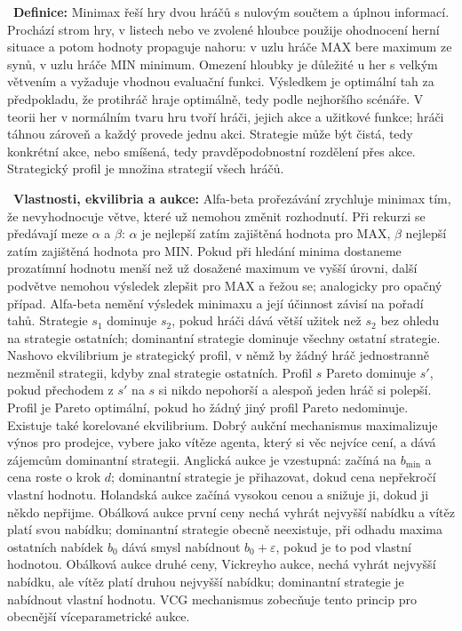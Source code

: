 \begin{odpoved}
\setlength{\parskip}{2pt}
\noindent{}\ \textbf{Definice:} Minimax řeší hry dvou hráčů s nulovým součtem a úplnou informací. Prochází strom hry, v listech nebo ve zvolené hloubce použije ohodnocení herní situace a potom hodnoty propaguje nahoru: v uzlu hráče MAX bere maximum ze synů, v uzlu hráče MIN minimum. Omezení hloubky je důležité u her s velkým větvením a vyžaduje vhodnou evaluační funkci. Výsledkem je optimální tah za předpokladu, že protihráč hraje optimálně, tedy podle nejhoršího scénáře. V teorii her v normálním tvaru hru tvoří hráči, jejich akce a užitkové funkce; hráči táhnou zároveň a každý provede jednu akci. Strategie může být čistá, tedy konkrétní akce, nebo smíšená, tedy pravděpodobnostní rozdělení přes akce. Strategický profil je množina strategií všech hráčů.\par
\noindent{}\ \textbf{Vlastnosti, ekvilibria a aukce:} Alfa-beta prořezávání zrychluje minimax tím, že nevyhodnocuje větve, které už nemohou změnit rozhodnutí. Při rekurzi se předávají meze $\alpha$ a $\beta$: $\alpha$ je nejlepší zatím zajištěná hodnota pro MAX, $\beta$ nejlepší zatím zajištěná hodnota pro MIN. Pokud při hledání minima dostaneme prozatímní hodnotu menší než už dosažené maximum ve vyšší úrovni, další podvětve nemohou výsledek zlepšit pro MAX a řežou se; analogicky pro opačný případ. Alfa-beta nemění výsledek minimaxu a její účinnost závisí na pořadí tahů. Strategie $s_1$ dominuje $s_2$, pokud hráči dává větší užitek než $s_2$ bez ohledu na strategie ostatních; dominantní strategie dominuje všechny ostatní strategie. Nashovo ekvilibrium je strategický profil, v němž by žádný hráč jednostranně nezměnil strategii, kdyby znal strategie ostatních. Profil $s$ Pareto dominuje $s'$, pokud přechodem z $s'$ na $s$ si nikdo nepohorší a alespoň jeden hráč si polepší. Profil je Pareto optimální, pokud ho žádný jiný profil Pareto nedominuje. Existuje také korelované ekvilibrium. Dobrý aukční mechanismus maximalizuje výnos pro prodejce, vybere jako vítěze agenta, který si věc nejvíce cení, a dává zájemcům dominantní strategii. Anglická aukce je vzestupná: začíná na $b_{\min}$ a cena roste o krok $d$; dominantní strategie je přihazovat, dokud cena nepřekročí vlastní hodnotu. Holandská aukce začíná vysokou cenou a snižuje ji, dokud ji někdo nepřijme. Obálková aukce první ceny nechá vyhrát nejvyšší nabídku a vítěz platí svou nabídku; dominantní strategie obecně neexistuje, při odhadu maxima ostatních nabídek $b_0$ dává smysl nabídnout $b_0+\varepsilon$, pokud je to pod vlastní hodnotou. Obálková aukce druhé ceny, Vickreyho aukce, nechá vyhrát nejvyšší nabídku, ale vítěz platí druhou nejvyšší nabídku; dominantní strategie je nabídnout vlastní hodnotu. VCG mechanismus zobecňuje tento princip pro obecnější víceparametrické aukce.\par

\end{odpoved}
